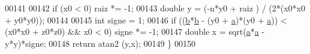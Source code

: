 \begin{DoxyCode}
00141     
00142     \textcolor{keywordflow}{if} (x0 < 0) raiz *= -1;
00143     \textcolor{keywordtype}{double} y = (-n*y0 + raiz ) / (2*(x0*x0 + y0*y0));
00144     
00145     \textcolor{keywordtype}{int} signe = 1;
00146     \textcolor{keywordflow}{if} ((\hyperlink{a00007_a14f03febaa39a60b9bf7ff9b9151060c}{b}*\hyperlink{a00007_a14f03febaa39a60b9bf7ff9b9151060c}{b} - (y0 + \hyperlink{a00007_a7dc3998d380d61406fe4485f9872edff}{a})*(y0 + \hyperlink{a00007_a7dc3998d380d61406fe4485f9872edff}{a})) < (x0*x0 + z0*z0) && x0 < 0) signe *= -1;
00147     \textcolor{keywordtype}{double} x = sqrt(\hyperlink{a00007_a7dc3998d380d61406fe4485f9872edff}{a}*\hyperlink{a00007_a7dc3998d380d61406fe4485f9872edff}{a} - y*y)*signe;
00148     \textcolor{keywordflow}{return} atan2 (y,x);
00149 \}
00150 
\end{DoxyCode}
